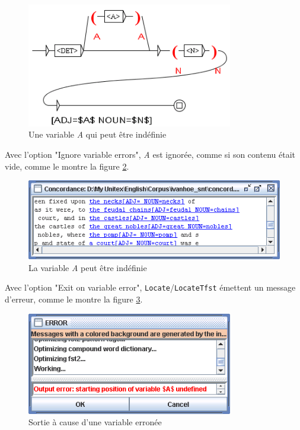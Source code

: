 \bigskip
\begin{figure}[!ht]
\begin{center}
\includegraphics[width=9cm]{resources/img/fig6-advanced-options5.png}
\caption{Une variable \textit{A} qui peut être indéfinie
\label{fig6-advanced-options5}}
\end{center}
\end{figure}

\noindent Avec l'option "Ignore variable errors", \textit{A} est ignorée, comme si son contenu était
vide, comme le montre la figure
\ref{fig6-advanced-options6}. 

\bigskip
\begin{figure}[!ht]
\begin{center}
\includegraphics[width=12cm]{resources/img/fig6-advanced-options6.png}
\caption{La variable \textit{A} peut être indéfinie
\label{fig6-advanced-options6}}
\end{center}
\end{figure}


\noindent Avec l'option "Exit on variable error", \verb+Locate+/\verb+LocateTfst+
émettent un message d'erreur, comme le montre la figure
\ref{fig6-advanced-options7}.

\bigskip
\begin{figure}[!ht]
\begin{center}
\includegraphics[width=9cm]{resources/img/fig6-advanced-options7.png}
\caption{Sortie à cause d'une variable erronée\label{fig6-advanced-options7}}
\end{center}
\end{figure}

